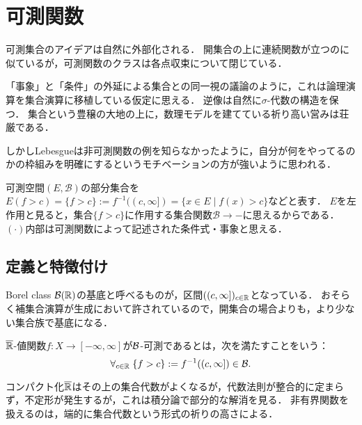 \documentclass[uplatex, dvipdfmx]{jsreport}
\renewcommand{\B}{\mathcal{B}}
\begin{document}
\section{可測関数}

\begin{tcolorbox}[colframe=ForestGreen, colback=ForestGreen!10!white,breakable,colbacktitle=ForestGreen!40!white,coltitle=black,fonttitle=\bfseries\sffamily,
title=測度の射は何か]
    可測集合のアイデアは自然に外部化される．
    開集合の上に連続関数が立つのに似ているが，可測関数のクラスは各点収束について閉じている．

    「事象」と「条件」の外延による集合との同一視の議論のように，これは論理演算を集合演算に移植している仮定に思える．
    逆像は自然に$\sigma$-代数の構造を保つ．
    集合という豊穣の大地の上に，数理モデルを建てている祈り高い営みは荘厳である．

    しかしLebesgueは非可測関数の例を知らなかったように，自分が何をやってるのかの枠組みを明確にするというモチベーションの方が強いように思われる．
\end{tcolorbox}

\begin{notation}
    可測空間$(E,\B)$の部分集合を
    $E(f>c)=\{f>c\}:=f^{-1}((c,\infty])=\{x\in E\mid f(x)>c\}$などと表す．
    $E$を左作用と見ると，集合$\{f>c\}$に作用する集合関数$\B\to-$に思えるからである．$(\cdot)$内部は可測関数によって記述された条件式・事象と思える．
\end{notation}

\subsection{定義と特徴付け}

\begin{tcolorbox}[colframe=ForestGreen, colback=ForestGreen!10!white,breakable,colbacktitle=ForestGreen!40!white,coltitle=black,fonttitle=\bfseries\sffamily,
title=]
    Borel class $\mathcal{B}(\mathbb{R})$の基底と呼べるものが，区間$((c,\infty])_{c\in\mathbb{R}}$となっている．
    おそらく補集合演算が生成において許されているので，開集合の場合よりも，より少ない集合族で基底になる．
\end{tcolorbox}

\begin{definition}
    $\overline{\mathbb{R}}$-値関数$f:X\to[-\infty,\infty]$が$\mathcal{B}$-可測であるとは，次を満たすことをいう：
    \[\forall_{c\in\mathbb{R}}\;\{f>c\}:=f^{-1}((c,\infty])\in\mathcal{B}.\]
\end{definition}
\begin{remarks}
    コンパクト化$\overline{\mathbb{R}}$はその上の集合代数がよくなるが，代数法則が整合的に定まらず，不定形が発生するが，これは積分論で部分的な解消を見る．
    非有界関数を扱えるのは，端的に集合代数という形式の祈りの高さによる．
\end{remarks}
\end{document}
